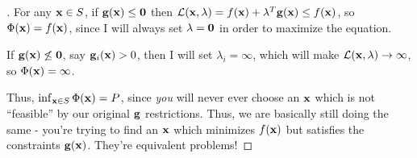 \begin{proof}[]
For any $\mathbf{x} \in S$, if $\mathbf{g}(\mathbf{x}) \leq \mathbf{0}$ then 
$\mathcal{L}(\mathbf{x}, \lambda) = f(\mathbf{x}) + \lambda^T\mathbf{g}(\mathbf{x}) \leq f(\mathbf{x})$, so
$\Phi(\mathbf{x}) = f(\mathbf{x})$, since I will always set $\lambda = \mathbf{0}$ in order
to maximize the equation.

If $\mathbf{g}(\mathbf{x}) \not \leq \mathbf{0}$, say $\mathbf{g}_i(\mathbf{x}) > 0$, then I will set $\lambda_i =
\infty$, which will make
$\mathcal{L}(\mathbf{x}, \lambda) \rightarrow \infty$, so $\Phi(\mathbf{x}) = \infty$.

Thus, $\inf_{\mathbf{x} \in S} \Phi(\mathbf{x}) = P$, since \textit{you} will never ever choose an
$\mathbf{x}$ which is not ``feasible'' by our original $\mathbf{g}$ restrictions. Thus, we
are basically still doing the same - you're trying to find an $\mathbf{x}$ which minimizes
$f(\mathbf{x})$ but satisfies the constraints $\mathbf{g}(\mathbf{x})$. They're equivalent problems!
\end{proof}
